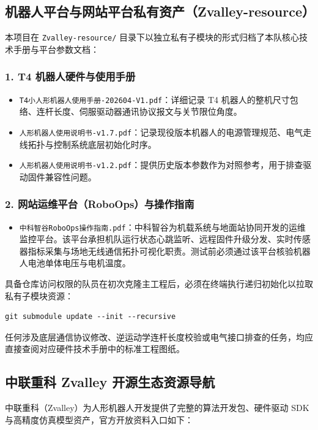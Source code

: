 \subsection{机器人平台与网站平台私有资产（Zvalley-resource）}

本项目在 \texttt{Zvalley-resource/} 目录下以独立私有子模块的形式归档了本队核心技术手册与平台参数文档：

\subsubsection{1. T4 机器人硬件与使用手册}
\begin{itemize}[leftmargin=*]
    \item \texttt{T4小人形机器人使用手册-202604-V1.pdf}：详细记录 T4 机器人的整机尺寸包络、连杆长度、伺服驱动器通讯协议报文与关节限位角度。
    \item \texttt{人形机器人使用说明书-v1.7.pdf}：记录现役版本机器人的电源管理规范、电气走线拓扑与控制系统底层初始化时序。
    \item \texttt{人形机器人使用说明书-v1.2.pdf}：提供历史版本参数作为对照参考，用于排查驱动固件兼容性问题。
\end{itemize}

\subsubsection{2. 网站运维平台（RoboOps）与操作指南}
\begin{itemize}[leftmargin=*]
    \item \texttt{中科智谷RoboOps操作指南.pdf}：中科智谷为机载系统与地面站协同开发的运维监控平台。该平台承担机队运行状态心跳监听、远程固件升级分发、实时传感器指标采集与场地无线通信拓扑可视化职责。测试前必须通过该平台核验机器人电池单体电压与电机温度。
\end{itemize}

具备仓库访问权限的队员在初次克隆主工程后，必须在终端执行递归初始化以拉取私有子模块资源：
\begin{verbatim}
git submodule update --init --recursive
\end{verbatim}
任何涉及底层通信协议修改、逆运动学连杆长度校验或电气接口排查的任务，均应直接查阅对应硬件技术手册中的标准工程图纸。\practice

\subsection{中联重科 Zvalley 开源生态资源导航}

中联重科（Zvalley）为人形机器人开发提供了完整的算法开发包、硬件驱动 SDK 与高精度仿真模型资产，官方开放资料入口如下：

